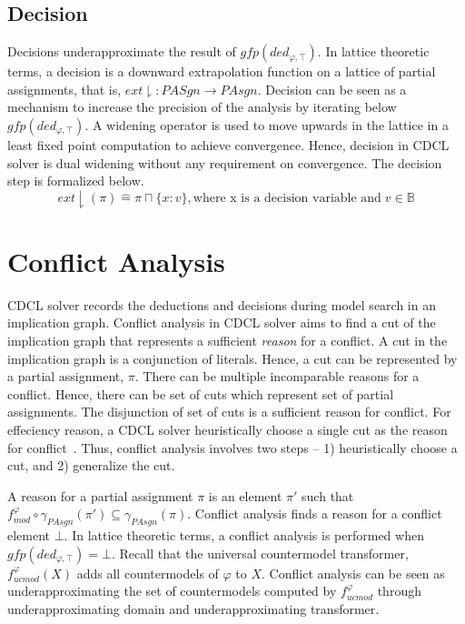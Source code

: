 \subsection{Decision}
%
Decisions underapproximate the result of $gfp(ded_{\varphi,\top})$. In lattice
theoretic terms, a decision is a downward extrapolation function on a lattice 
of partial assignments, that is, $ext \downharpoonright \colon PASgn \rightarrow 
PAsgn$.  Decision can be seen as a mechanism to increase the precision of the analysis by
iterating below $gfp(ded_{\varphi,\top})$. A widening operator is used to move
upwards in the lattice in a least fixed point computation to achieve
convergence. Hence, decision in CDCL solver is dual widening without any
requirement on convergence.  The decision step is formalized below. 
\[
  ext \downharpoonright (\pi) \mathrel{\hat=} \pi \sqcap \{x:v\}, \text{where x
  is a decision variable and}\; v \in \mathbb{B}
\]
%
\section{Conflict Analysis}
CDCL solver records the deductions and decisions during model search in an
implication graph. Conflict analysis in CDCL solver aims to find a cut of the
implication graph that represents a sufficient \emph{reason} for a conflict. A cut
in the implication graph is a conjunction of literals.  Hence, a cut can be
represented by a partial assignment, $\pi$.  There can be multiple incomparable
reasons for a conflict. Hence, there can be set of cuts which represent set of
partial assignments. The disjunction of set of cuts is a sufficient reason
for conflict. For effeciency reason, a CDCL solver heuristically choose a single 
cut as the reason for conflict~\cite{cdcl}.  Thus, conflict analysis involves two steps -- 
1) heuristically choose a cut, and 2) generalize the cut.

A reason for a partial assignment $\pi$ is an element $\pi'$ such that
$f_{mod}^\varphi \circ \gamma_{PAsgn}(\pi') \subseteq \gamma_{PAsgn}(\pi)$.
Conflict analysis finds a reason for a conflict element $\bot$. 
In lattice theoretic terms, a conflict analysis is performed when 
$gfp(ded_{\varphi,\top}) = \bot$. Recall that the universal countermodel
transformer, $f_{ucmod}^\varphi(X)$ adds all countermodels of $\varphi$ to 
$X$. Conflict analysis can be seen as underapproximating the set of
countermodels computed by $f_{ucmod}^\varphi$ through underapproximating 
domain and underapproximating transformer.

